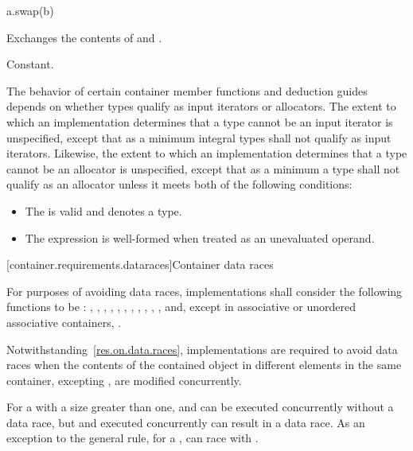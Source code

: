 %
\begin{itemdecl}
a.swap(b)
\end{itemdecl}

\begin{itemdescr}
\pnum
\result
{}

\pnum
\effects
Exchanges the contents of  and .

\pnum
\complexity
Constant.
\end{itemdescr}

\pnum
The behavior of certain container member functions and deduction guides
depends on whether types qualify as input iterators or allocators.
The extent to which an implementation determines that a type cannot be an input
iterator is unspecified, except that as a minimum integral types shall not qualify
as input iterators.
Likewise, the extent to which an implementation determines that a type cannot be
an allocator is unspecified, except that as a minimum a type  shall not qualify
as an allocator unless it meets both of the following conditions:

\begin{itemize}
\item The  
is valid and denotes a type.

\item The expression 
is well-formed when treated as an unevaluated operand.
\end{itemize}

[container.requirements.dataraces]{Container data races}

\pnum
For purposes of avoiding data races, implementations shall
consider the following functions to be : , ,
, , , , , ,
, , ,  and, except in
associative or unordered associative containers, .

\pnum
Notwithstanding~\ref{res.on.data.races}, implementations are required to avoid data
races when the contents of the contained object in different elements in the same
container, excepting , are modified concurrently.

\pnum
\begin{note}
For a  with a size greater than one, 
and  can be executed concurrently without a data race, but
 and  executed concurrently can result in a data
race.
As an exception to the general rule, for a , 
can race with .
\end{note}

